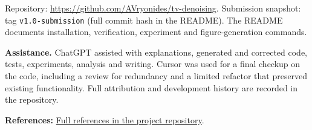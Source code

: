 \documentclass[10pt,a4paper]{article}
\begin{document}
Repository:
\url{https://github.com/AVryonides/tv-denoising}.
Submission snapshot: tag \texttt{v1.0-submission}
(full commit hash in the README).
The README documents installation, verification, experiment and
figure-generation commands.

\textbf{Assistance.}
ChatGPT assisted with explanations, generated and corrected code,
tests, experiments, analysis and writing. Cursor was used for a
final checkup on the code, including a review for redundancy and a
limited refactor that preserved existing functionality. Full
attribution and development history are recorded in the repository.

\noindent\textbf{References:}
\href{https://github.com/AVryonides/tv-denoising#references}
{Full references in the project repository}.
\end{document}
